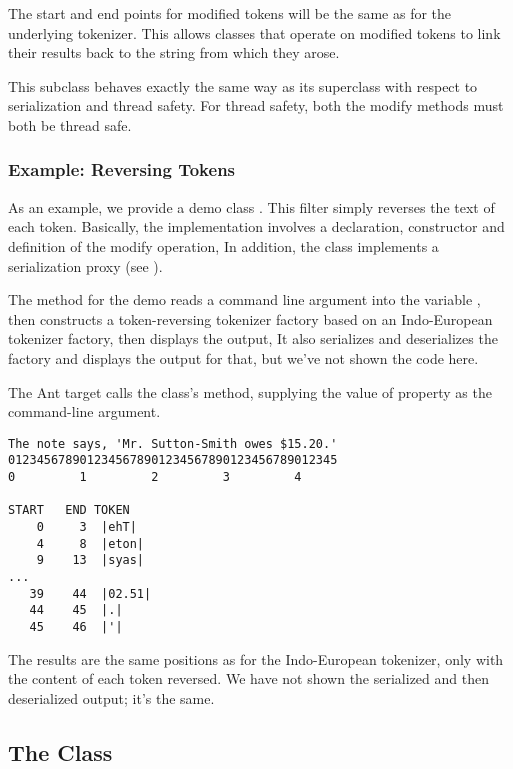 The start and end points for modified tokens will be the same as for
the underlying tokenizer.  This allows classes that operate on
modified tokens to link their results back to the string from which
they arose.

This subclass behaves exactly the same way as its superclass with
respect to serialization and thread safety.  For thread safety, both
the modify methods must both be thread safe.


\subsubsection{Example: Reversing Tokens}

As an example, we provide a demo class
.  This filter simply reverses the
text of each token. Basically, the implementation involves a declaration,
constructor and definition of the modify operation,
%
%
In addition, the class implements a serialization proxy (see
).

The  method for the demo reads a command line
argument into the variable , then constructs a token-reversing
tokenizer factory based on an Indo-European tokenizer factory,
then displays the output,
%
%
It also serializes and deserializes the factory and displays
the output for that, but we've not shown the code here.

The Ant target  calls the class's 
method, supplying the value of property  as the command-line
argument.
%
\begin{verbatim}
The note says, 'Mr. Sutton-Smith owes $15.20.'
0123456789012345678901234567890123456789012345
0         1         2         3         4

START   END TOKEN
    0     3  |ehT|
    4     8  |eton|
    9    13  |syas|
...
   39    44  |02.51|
   44    45  |.|
   45    46  |'|
\end{verbatim}
%
The results are the same positions as for the Indo-European tokenizer,
only with the content of each token reversed.  We have not shown the
serialized and then deserialized output; it's the same.

\subsection{The  Class}

